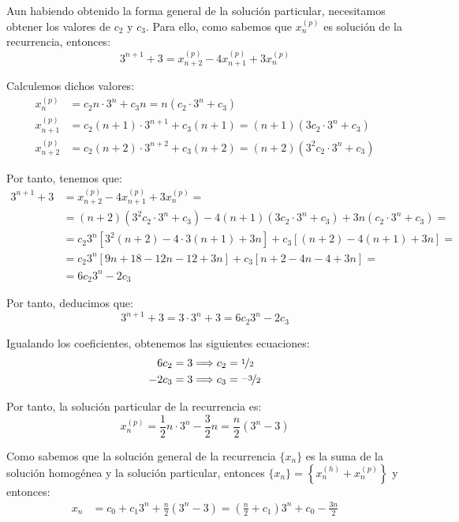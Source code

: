 \begin{ejercicio}
    Aun habiendo obtenido la forma general de la solución particular, necesitamos obtener los valores de $c_2$ y $c_3$.
    Para ello, como sabemos que $x_n^{(p)}$ es solución de la recurrencia, entonces:
    \begin{equation*}
        3^{n+1} + 3 = x_{n+2}^{(p)} - 4x_{n+1}^{(p)} + 3x_n^{(p)}
    \end{equation*}

    Calculemos dichos valores:
    \begin{align*}
        x_n^{(p)} &= c_2n\cdot 3^n + c_3n = n(c_2\cdot 3^n + c_3)\\
        x_{n+1}^{(p)} &= c_2(n+1)\cdot 3^{n+1} + c_3(n+1)
        = (n+1)(3c_2\cdot 3^{n} + c_3)\\
        x_{n+2}^{(p)} &= c_2(n+2)\cdot 3^{n+2} + c_3(n+2)
        = (n+2)(3^2c_2\cdot 3^{n} + c_3)
    \end{align*}

    Por tanto, tenemos que:
    \begin{align*}
        3^{n+1} + 3 &= x_{n+2}^{(p)} - 4x_{n+1}^{(p)} + 3x_n^{(p)} =\\
        &= (n+2)(3^2c_2\cdot 3^{n} + c_3) - 4(n+1)(3c_2\cdot 3^{n} + c_3) + 3n(c_2\cdot 3^n + c_3) =\\
        &= c_2 3^n[3^2(n+2) - 4\cdot 3(n+1) + 3n] + c_3[(n+2) - 4(n+1) + 3n] =\\
        &= c_2 3^n[9n + 18 - 12n - 12 + 3n] + c_3[n+2 - 4n - 4 + 3n] =\\
        &= 6c_2 3^n -2c_3
    \end{align*}

    Por tanto, deducimos que:
    \begin{equation*}
        3^{n+1} + 3 = 3\cdot 3^n + 3 = 6c_2 3^n -2c_3
    \end{equation*}

    Igualando los coeficientes, obtenemos las siguientes ecuaciones:
    \begin{align*}
        6c_2 &= 3 \Longrightarrow c_2 = \nicefrac{1}{2} \\
        -2c_3 &= 3 \Longrightarrow c_3 = \nicefrac{-3}{2}
    \end{align*}

    Por tanto, la solución particular de la recurrencia es:
    \begin{equation*}
        x_n^{(p)} = \frac{1}{2}n\cdot 3^n - \frac{3}{2}n
        = \frac{n}{2}\left(3^n - 3\right)
    \end{equation*}

    Como sabemos que la solución general de la recurrencia $\{x_n\}$ es la suma de la solución homogénea y la solución particular, entonces
    $\{x_n\} = \left\{x_n^{(h)} + x_n^{(p)}\right\}$ y entonces:
    \begin{align*}
        x_n &= c_0 + c_1 3^n + \frac{n}{2}\left(3^n - 3\right) 
        = \left(\frac{n}{2} + c_1\right)3^n + c_0 - \frac{3n}{2}
    \end{align*}
\end{ejercicio}

